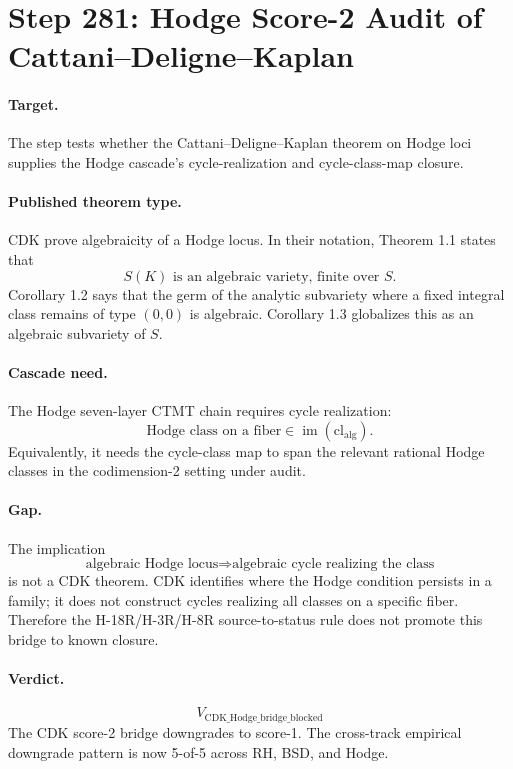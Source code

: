\section*{Step 281: Hodge Score-2 Audit of Cattani--Deligne--Kaplan}

\paragraph{Target.}
The step tests whether the Cattani--Deligne--Kaplan theorem on Hodge loci supplies the Hodge cascade's cycle-realization and cycle-class-map closure.

\paragraph{Published theorem type.}
CDK prove algebraicity of a Hodge locus.  In their notation, Theorem 1.1 states that
\[
  S(K) \text{ is an algebraic variety, finite over } S.
\]
Corollary 1.2 says that the germ of the analytic subvariety where a fixed integral class remains of type \((0,0)\) is algebraic.  Corollary 1.3 globalizes this as an algebraic subvariety of \(S\).

\paragraph{Cascade need.}
The Hodge seven-layer CTMT chain requires cycle realization:
\[
  \text{Hodge class on a fiber} \in \operatorname{im}(\mathrm{cl}_{\mathrm{alg}}).
\]
Equivalently, it needs the cycle-class map to span the relevant rational Hodge classes in the codimension-2 setting under audit.

\paragraph{Gap.}
The implication
\[
  \text{algebraic Hodge locus} \Rightarrow \text{algebraic cycle realizing the class}
\]
is not a CDK theorem.  CDK identifies where the Hodge condition persists in a family; it does not construct cycles realizing all classes on a specific fiber.  Therefore the H-18R/H-3R/H-8R source-to-status rule does not promote this bridge to known closure.

\paragraph{Verdict.}
\[
  \boxed{V_{\mathrm{CDK\_Hodge\_bridge\_blocked}}}
\]
The CDK score-2 bridge downgrades to score-1.  The cross-track empirical downgrade pattern is now 5-of-5 across RH, BSD, and Hodge.
